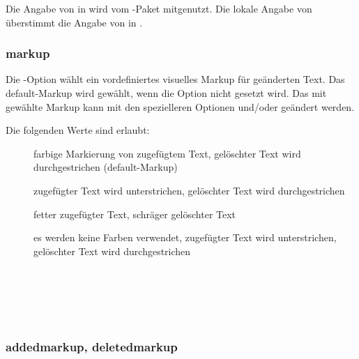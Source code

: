 Die Angabe von  in  wird vom -Paket mitgenutzt.
Die lokale Angabe von  überstimmt die Angabe von  in .


\subsubsection{markup}

Die -Option wählt ein vordefiniertes visuelles Markup für geänderten Text.
Das default-Markup wird gewählt, wenn die Option nicht gesetzt wird.
Das mit  gewählte Markup kann mit den spezielleren Optionen  und/oder  geändert werden.

Die folgenden Werte sind erlaubt:
\begin{description}
	\item [] farbige Markierung von zugefügtem Text, gelöschter Text wird durchgestrichen (default-Markup)
	\item [] zugefügter Text wird unterstrichen, gelöschter Text wird durchgestrichen
	\item [] fetter zugefügter Text, schräger gelöschter Text
	\item [] es werden keine Farben verwendet, zugefügter Text wird unterstrichen, gelöschter Text wird durchgestrichen
\end{description}

\begin{chusage}
		\>\\
	\usageexample
		\> \Corresponds\ \\
		\>\\
		\>\\
		\>
\end{chusage}


\subsubsection{addedmarkup, deletedmarkup}


